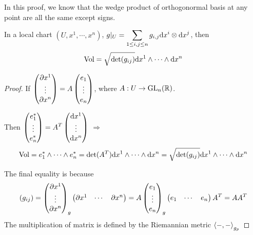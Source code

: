 \begin{remark}
    In this proof, we know that the wedge product of orthogonormal basis at any point are all the same except signs.
\end{remark}
\begin{proposition}\label{prop:Calculation of volume form in local chart}
    In a local chart  $ (U,x^1,\cdots,x^n ) $,  $ g|_U =\displaystyle\sum_{1 \leq i,j \leq n}g_{i,j}\mathrm{d} x^i\otimes \mathrm{d} x^j $, then 
    \begin{equation}
        \mathrm{Vol}=\sqrt{\det(g_{ij})}\mathrm{d} x^1\wedge\cdots\wedge \mathrm{d} x^n\label{eq:Calculation of volume form in local chart}
    \end{equation} 
\end{proposition}
\begin{proof}
    If  $ \displaystyle\begin{pmatrix}
        \partial x^1\\
        \vdots\\
        \partial x^n
    \end{pmatrix}=A\begin{pmatrix}
        e_1\\
        \vdots\\
        e_n
    \end{pmatrix} $, where  $ A:U\rightarrow \mathrm{GL}_n(\mathbb R) $.
    
    Then  $ \displaystyle\begin{pmatrix}
        e_1^*\\
        \vdots\\
        e_n^*
    \end{pmatrix}=A^T\begin{pmatrix}
        \mathrm{d} x^1\\
        \vdots\\
        \mathrm{d} x^n
    \end{pmatrix} $ $ \Rightarrow  $ \[\mathrm{Vol}=e_1^*\wedge\cdots\wedge e_n^*=\det(A^T)\mathrm{d} x^1\wedge\cdots\wedge \mathrm{d} x^n=\sqrt{\det(g_{ij})}\mathrm{d} x^1\wedge\cdots\wedge \mathrm{d} x^n \]
    
    The final equality is because  \[\displaystyle (g_{ij})=\displaystyle\begin{pmatrix}
        \partial x^1\\
        \vdots\\
        \partial x^n
    \end{pmatrix}_{g}\begin{pmatrix}
        \partial x^1&\cdots &\partial x^n
    \end{pmatrix}=A\begin{pmatrix}
        e_1\\
        \vdots\\
        e_n
    \end{pmatrix}_g\begin{pmatrix}
        e_1&\cdots&e_n
    \end{pmatrix}A^T=AA^T \]
    The multiplication of matrix is defined by the Riemannian metric  $ \left<-,-\right>_{g_p} $ 
\end{proof}
